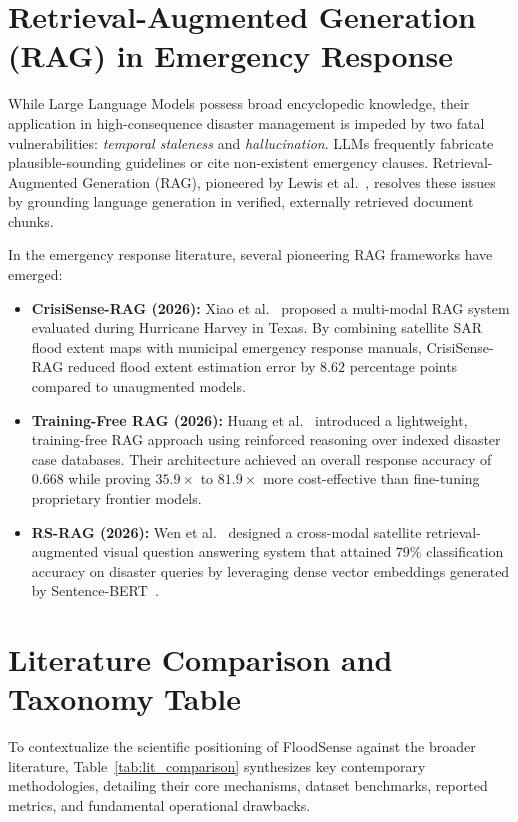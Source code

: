 \section{Retrieval-Augmented Generation (RAG) in Emergency Response}
While Large Language Models possess broad encyclopedic knowledge, their application in high-consequence disaster management is impeded by two fatal vulnerabilities: \textit{temporal staleness} and \textit{hallucination}. LLMs frequently fabricate plausible-sounding guidelines or cite non-existent emergency clauses. Retrieval-Augmented Generation (RAG), pioneered by Lewis et al.~\cite{lewis2020retrieval}, resolves these issues by grounding language generation in verified, externally retrieved document chunks.

In the emergency response literature, several pioneering RAG frameworks have emerged:
\begin{itemize}
    \item \textbf{CrisiSense-RAG (2026):} Xiao et al.~\cite{crisisense2025} proposed a multi-modal RAG system evaluated during Hurricane Harvey in Texas. By combining satellite SAR flood extent maps with municipal emergency response manuals, CrisiSense-RAG reduced flood extent estimation error by $8.62$ percentage points compared to unaugmented models.
    \item \textbf{Training-Free RAG (2026):} Huang et al.~\cite{trainingfree_rag2025} introduced a lightweight, training-free RAG approach using reinforced reasoning over indexed disaster case databases. Their architecture achieved an overall response accuracy of $0.668$ while proving $35.9\times$ to $81.9\times$ more cost-effective than fine-tuning proprietary frontier models.
    \item \textbf{RS-RAG (2026):} Wen et al.~\cite{rs_rag2025} designed a cross-modal satellite retrieval-augmented visual question answering system that attained $79\%$ classification accuracy on disaster queries by leveraging dense vector embeddings generated by Sentence-BERT~\cite{reimers2019sentence}.
\end{itemize}

\section{Literature Comparison and Taxonomy Table}
To contextualize the scientific positioning of FloodSense against the broader literature, Table~\ref{tab:lit_comparison} synthesizes key contemporary methodologies, detailing their core mechanisms, dataset benchmarks, reported metrics, and fundamental operational drawbacks.

